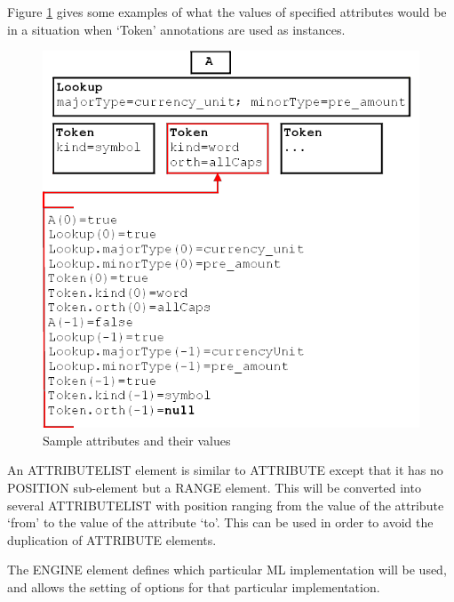 Figure \ref{fig:attributes} gives some examples of what the values of
specified attributes would be in a situation when `Token' annotations
are used as instances.

%
\begin{figure}[htb]
\begin{center}
\includegraphics[scale=0.5]{attributes.png}
\end{center}
\caption{Sample attributes and their values}
\label{fig:attributes}
\end{figure}
%

An ATTRIBUTELIST element is similar to ATTRIBUTE except that it has no POSITION
sub-element but a RANGE element. This will be converted into several
ATTRIBUTELIST with position ranging from the value of the attribute `from' to
the value of the attribute `to'. This can be used in order to avoid the
duplication of ATTRIBUTE elements.


The ENGINE element defines which particular ML implementation will be
used, and allows the setting of options for that particular
implementation.


